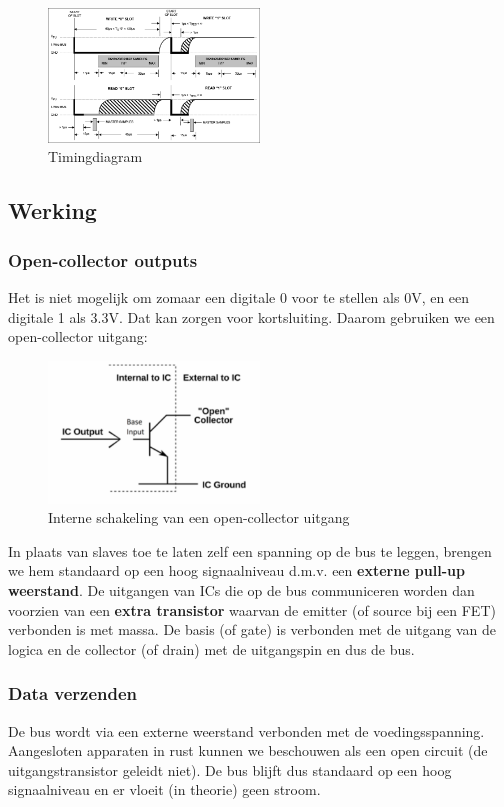 \documentclass{article}
\newcommand{\bold}[1]{\textbf{#1}}
\begin{document}
\begin{figure}[H]
    \centering
    \includegraphics[width=0.5\textwidth]{timing-1w.png}
    \caption{Timingdiagram}
\end{figure}

\subsection{Werking}
\subsubsection{Open-collector outputs}
Het is niet mogelijk om zomaar een digitale 0 voor te stellen als 0V, en een digitale 1 als 3.3V.
Dat kan zorgen voor kortsluiting. Daarom gebruiken we een open-collector uitgang:

\begin{figure}[H]
    \centering
    \includegraphics[width=0.5\textwidth]{open-collector.png}
    \caption{Interne schakeling van een open-collector uitgang}
\end{figure}

In plaats van slaves toe te laten zelf een spanning op de bus te leggen, brengen we hem standaard op
een hoog signaalniveau d.m.v. een \bold{externe pull-up weerstand}. 
De uitgangen van ICs die op de bus communiceren worden dan voorzien van een \bold{extra transistor}
waarvan de emitter (of source bij een FET) verbonden is met massa. 
De basis (of gate) is verbonden met de uitgang van de logica en de collector (of drain)
met de uitgangspin en dus de bus.

\subsubsection{Data verzenden}
De bus wordt via een externe weerstand verbonden met de voedingsspanning.
Aangesloten apparaten in rust kunnen we beschouwen als een open circuit (de uitgangstransistor geleidt niet).
De bus blijft dus standaard op een hoog signaalniveau en er vloeit (in theorie) geen stroom.
\end{document}
